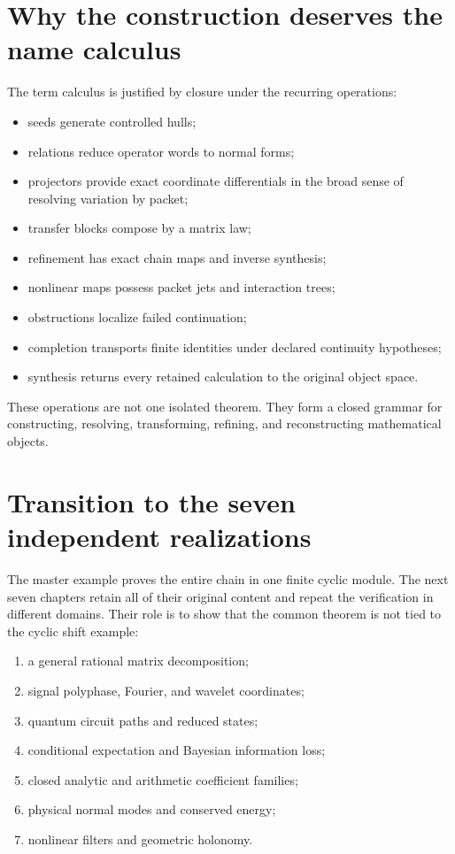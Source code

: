 
\section{Why the construction deserves the name calculus}
The term calculus is justified by closure under the recurring operations:
\begin{itemize}[leftmargin=1.6em]
\item seeds generate controlled hulls;
\item relations reduce operator words to normal forms;
\item projectors provide exact coordinate differentials in the broad sense of resolving variation by packet;
\item transfer blocks compose by a matrix law;
\item refinement has exact chain maps and inverse synthesis;
\item nonlinear maps possess packet jets and interaction trees;
\item obstructions localize failed continuation;
\item completion transports finite identities under declared continuity hypotheses;
\item synthesis returns every retained calculation to the original object space.
\end{itemize}
These operations are not one isolated theorem.  They form a closed grammar for constructing, resolving, transforming, refining, and reconstructing mathematical objects.


\section{Transition to the seven independent realizations}
The master example proves the entire chain in one finite cyclic module.  The next seven chapters retain all of their original content and repeat the verification in different domains.  Their role is to show that the common theorem is not tied to the cyclic shift example:
\begin{enumerate}[label=\arabic*.,leftmargin=2em]
\item a general rational matrix decomposition;
\item signal polyphase, Fourier, and wavelet coordinates;
\item quantum circuit paths and reduced states;
\item conditional expectation and Bayesian information loss;
\item closed analytic and arithmetic coefficient families;
\item physical normal modes and conserved energy;
\item nonlinear filters and geometric holonomy.
\end{enumerate}
